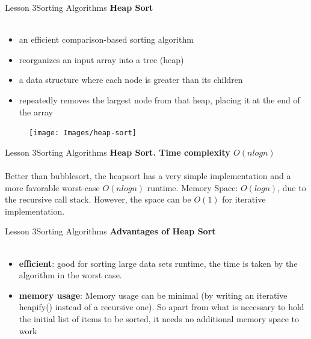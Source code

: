 \documentclass[aspectratio=1610]{beamer}
\begin{document}

\begin{frame}{Lesson 3}{Sorting Algorithms}
\LARGE
\textbf{Heap Sort}\\~\\
\begin{minipage}{0.65\textwidth}
\Large
\begin{itemize}
    \item an efficient comparison-based sorting algorithm
    \item reorganizes an input array into a tree (heap)
    \item a data structure where each node is greater than its children
    \item repeatedly removes the largest node from that heap, placing it at the end of the array
\end{itemize}
  \end{minipage}
\begin{minipage}{.0\textwidth}
      \begin{figure}
        \texttt{[image: Images/heap-sort]}
      \end{figure}
  \end{minipage}  
\end{frame}



\begin{frame}{Lesson 3}{Sorting Algorithms}
\LARGE
\textbf{Heap Sort. Time complexity $O(n log n)$}\\~\\
Better than bubblesort, the heapsort has a very simple implementation
and a more favorable worst-case $O(n log n)$ runtime. Memory Space:
$O(log n)$, due to the recursive call stack. However, the space can
be $O(1)$ for iterative implementation.
\end{frame}


\begin{frame}{Lesson 3}{Sorting Algorithms}
\LARGE
\textbf{Advantages of Heap Sort}\\~\\
\Large
\begin{itemize}
	\item \textbf{efficient}: good for sorting large data sets runtime, the time is taken by the algorithm in the worst case.
	\item \textbf{memory usage}: Memory usage can be minimal (by writing an iterative heapify() instead of a recursive one). So apart from what is necessary to hold the initial list of items to be sorted, it needs no additional memory space to work
\end{itemize}
\end{frame}
\end{document}
